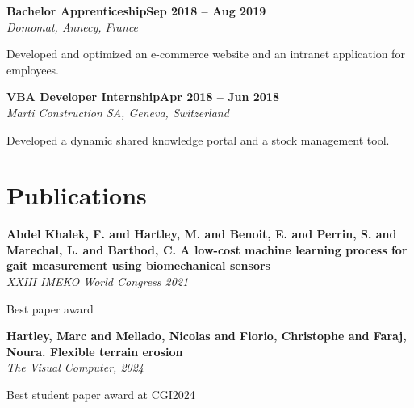 \documentclass[letterpaper,10pt]{article}
\newcommand{\heading}[2]{
  \hspace{10pt}#1\hfill#2\\
}
\newcommand{\headingBf}[2]{
  \heading{\textbf{#1}}{\textbf{#2}}
}
\newcommand{\headingIt}[2]{
  \heading{\textit{#1}}{\textit{#2}}
}
\newenvironment{resume_list}{
  \vspace{-7pt}
  \begin{itemize}[itemsep=-2px, parsep=1pt, leftmargin=30pt]
}{
  \end{itemize}
}
\begin{document}
  \headingBf{Bachelor Apprenticeship}{Sep 2018 -- Aug 2019}
  \headingIt{Domomat, Annecy, France}{}
  \begin{resume_list}
    \item Developed and optimized an e-commerce website and an intranet application for employees.
  \end{resume_list}

  \headingBf{VBA Developer Internship}{Apr 2018 -- Jun 2018}
  \headingIt{Marti Construction SA, Geneva, Switzerland}{}
  \begin{resume_list}
    \item Developed a dynamic shared knowledge portal and a stock management tool.
  \end{resume_list}


  \section{Publications}

  \headingBf{Abdel Khalek, F. and Hartley, M. and Benoit, E. and Perrin, S. and Marechal, L. and Barthod, C. A low-cost machine learning process for gait measurement using biomechanical sensors}{}
  \headingIt{XXIII IMEKO World Congress 2021}{}
  \begin{resume_list}
    \item Best paper award
  \end{resume_list}

  \headingBf{Hartley, Marc and Mellado, Nicolas and Fiorio, Christophe and Faraj, Noura. Flexible terrain erosion}{}
  \headingIt{The Visual Computer, 2024}{}
  \begin{resume_list}
    \item Best student paper award at CGI2024
  \end{resume_list}




\end{document}
